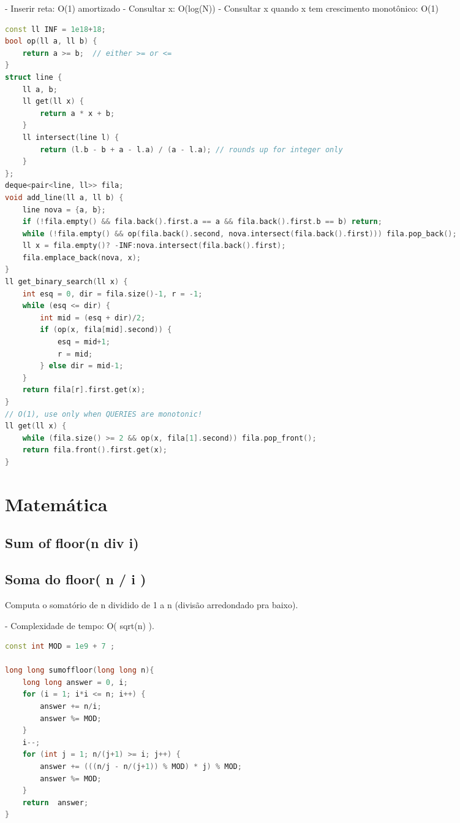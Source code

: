 \documentclass[11pt, a4paper, twoside]{article}
\begin{document}
- Inserir reta: O(1) amortizado
- Consultar x: O(log(N))
- Consultar x quando x tem crescimento monotônico: O(1)

\begin{lstlisting}[language=C++]
const ll INF = 1e18+18;
bool op(ll a, ll b) {
    return a >= b;  // either >= or <=
}
struct line {
    ll a, b;
    ll get(ll x) {
        return a * x + b;
    }
    ll intersect(line l) {
        return (l.b - b + a - l.a) / (a - l.a); // rounds up for integer only
    }
};
deque<pair<line, ll>> fila;
void add_line(ll a, ll b) {
    line nova = {a, b};
    if (!fila.empty() && fila.back().first.a == a && fila.back().first.b == b) return;
    while (!fila.empty() && op(fila.back().second, nova.intersect(fila.back().first))) fila.pop_back();
    ll x = fila.empty()? -INF:nova.intersect(fila.back().first);
    fila.emplace_back(nova, x);
}
ll get_binary_search(ll x) {
    int esq = 0, dir = fila.size()-1, r = -1;
    while (esq <= dir) {
        int mid = (esq + dir)/2;
        if (op(x, fila[mid].second)) {
            esq = mid+1;
            r = mid;
        } else dir = mid-1;
    }
    return fila[r].first.get(x);
}
// O(1), use only when QUERIES are monotonic!
ll get(ll x) {
    while (fila.size() >= 2 && op(x, fila[1].second)) fila.pop_front();
    return fila.front().first.get(x);
}
\end{lstlisting}

\newpage
%
%
%
%

\section{Matemática}

\subsection{Sum of floor(n div i)}


\subsection{Soma do floor( n / i )}



Computa o somatório de n dividido de 1 a n (divisão arredondado pra baixo).

- Complexidade de tempo: O( sqrt(n) ).

\begin{multicols}{2}
\begin{lstlisting}[language=C++]
const int MOD = 1e9 + 7 ;

long long sumoffloor(long long n){
    long long answer = 0, i;
    for (i = 1; i*i <= n; i++) {
        answer += n/i;
        answer %= MOD;
    }
    i--;
    for (int j = 1; n/(j+1) >= i; j++) {
        answer += (((n/j - n/(j+1)) % MOD) * j) % MOD;
        answer %= MOD;
    }
    return  answer;
}
\end{lstlisting}
\end{multicols}
\end{document}
